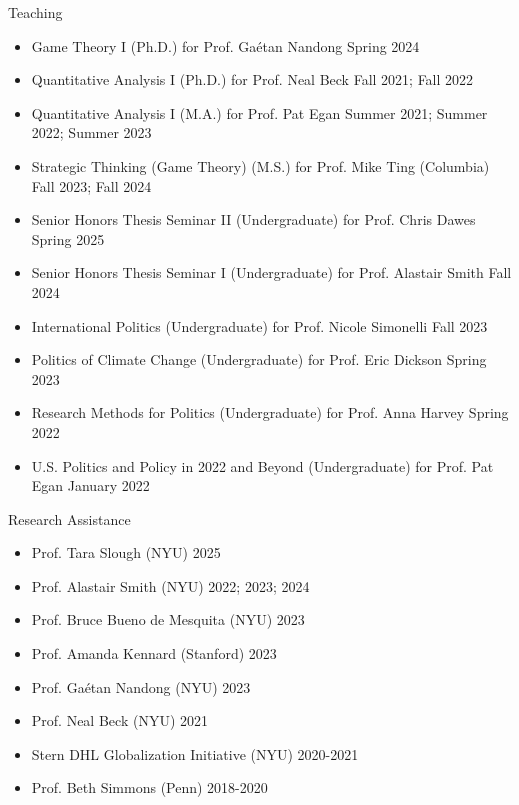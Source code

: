 \documentclass{resume} %
\begin{document}
\begin{rSection}{Teaching}
\begin{itemize}
\item Game Theory I (Ph.D.) for Prof. Ga\'etan Nandong \hfill Spring 2024
\item Quantitative Analysis I (Ph.D.) for Prof. Neal Beck \hfill Fall 2021; Fall 2022
\item Quantitative Analysis I (M.A.) for Prof. Pat Egan \hfill Summer 2021; Summer 2022; Summer 2023
\item Strategic Thinking (Game Theory) (M.S.) for Prof. Mike Ting (Columbia) \hfill Fall 2023; Fall 2024
\item Senior Honors Thesis Seminar II (Undergraduate) for Prof. Chris Dawes \hfill Spring 2025
\item Senior Honors Thesis Seminar I (Undergraduate) for Prof. Alastair Smith \hfill Fall 2024
\item International Politics (Undergraduate) for Prof. Nicole Simonelli \hfill Fall 2023
\item Politics of Climate Change (Undergraduate) for Prof. Eric Dickson \hfill Spring 2023
\item Research Methods for Politics (Undergraduate) for Prof. Anna Harvey \hfill Spring 2022
\item U.S. Politics and Policy in 2022 and Beyond (Undergraduate) for Prof. Pat Egan \hfill January 2022
\end{itemize}
\end{rSection}

\begin{rSection}{Research Assistance}
\begin{itemize}
\item Prof. Tara Slough (NYU) \hfill 2025
    \item Prof. Alastair Smith (NYU) \hfill 2022; 2023; 2024
    \item Prof. Bruce Bueno de Mesquita (NYU) \hfill 2023
   \item  Prof. Amanda Kennard (Stanford) \hfill 2023
    \item Prof. Ga\'etan Nandong (NYU) \hfill 2023
    \item Prof. Neal Beck (NYU) \hfill 2021
   \item  Stern DHL Globalization Initiative (NYU) \hfill 2020-2021
   \item  Prof. Beth Simmons (Penn) \hfill 2018-2020
    \end{itemize}
\end{rSection}
\end{document}
